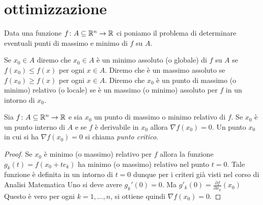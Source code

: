 \section{ottimizzazione}

Data una funzione $f \colon A\subseteq {\mathbb R}^n \to {\mathbb R}$ ci poniamo 
il problema di determinare eventuali punti di massimo e minimo di $f$ 
su $A$.

Se $x_0\in A$ diremo che $x_0\in A$ è un minimo assoluto (o globale) 
di $f$ su $A$ se $f(x_0) \le f(x)$ per ogni $x\in A$. 
Diremo che è un massimo assoluto se $f(x_0)\ge f(x)$ per ogni $x\in A$.
Diremo che $x_0$ è un punto di massimo (o minimo) relativo (o locale)
se è un massimo (o minimo) assoluto per $f$ in un intorno di $x_0$.

\begin{theorem}
Sia $f\colon A\subseteq {\mathbb R}^n \to {\mathbb R}$ e sia $x_0$ un punto 
di massimo o minimo relativo di $f$.
Se $x_0$ è un punto interno di $A$ e se $f$ è derivabile in $x_0$ 
allora $\nabla f(x_0)=0$.
Un punto $x_0$ in cui si ha $\nabla f(x_0) = 0$ si chiama 
\emph{punto critico}.
\end{theorem}
\begin{proof}
Se $x_0$ è minimo (o massimo) relativo per $f$
allora la funzione $g_k(t) = f(x_0+te_k)$ ha minimo (o massimo)
relativo nel punto $t=0$. 
Tale funzione è definita in un intorno di $t=0$ dunque 
per i criteri già visti nel corso di Analisi Matematica Uno
si deve avere $g_k'(0)=0$. 
Ma $g'_k(0) = \frac{\partial f}{\partial x_k}(x_0)$
Questo è vero per ogni $k=1,\dots,n$, si ottiene quindi $\nabla f(x_0)=0$.
\end{proof}

